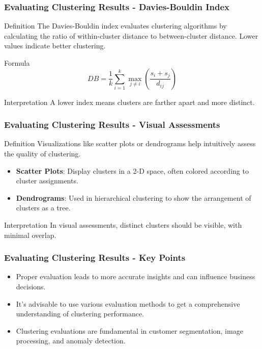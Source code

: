 \documentclass[aspectratio=169]{beamer}
\begin{document}
\begin{frame}[fragile]
    \frametitle{Evaluating Clustering Results - Davies-Bouldin Index}
    \begin{block}{Definition}
        The Davies-Bouldin index evaluates clustering algorithms by calculating the ratio of within-cluster distance to between-cluster distance. Lower values indicate better clustering.
    \end{block}
    \begin{block}{Formula}
        \begin{equation}
        DB = \frac{1}{k} \sum_{i=1}^{k} \max_{j \neq i} \left( \frac{s_i + s_j}{d_{ij}} \right)
        \end{equation}
    \end{block}
    \begin{block}{Interpretation}
        A lower index means clusters are farther apart and more distinct.
    \end{block}
\end{frame}

\begin{frame}[fragile]
    \frametitle{Evaluating Clustering Results - Visual Assessments}
    \begin{block}{Definition}
        Visualizations like scatter plots or dendrograms help intuitively assess the quality of clustering.
    \end{block}
    \begin{itemize}
        \item \textbf{Scatter Plots}: Display clusters in a 2-D space, often colored according to cluster assignments.
        \item \textbf{Dendrograms}: Used in hierarchical clustering to show the arrangement of clusters as a tree.
    \end{itemize}
    \begin{block}{Interpretation}
        In visual assessments, distinct clusters should be visible, with minimal overlap.
    \end{block}
\end{frame}

\begin{frame}[fragile]
    \frametitle{Evaluating Clustering Results - Key Points}
    \begin{itemize}
        \item Proper evaluation leads to more accurate insights and can influence business decisions.
        \item It's advisable to use various evaluation methods to get a comprehensive understanding of clustering performance.
        \item Clustering evaluations are fundamental in customer segmentation, image processing, and anomaly detection.
    \end{itemize}
\end{frame}
\end{document}
